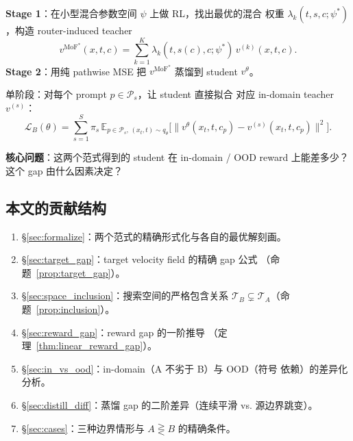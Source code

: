 \documentclass[11pt,a4paper]{article}
\newcommand{\loss}{\mathcal{L}}
\newcommand{\E}{\mathbb{E}}
\newcommand{\MoF}{\mathrm{MoF}}
\theoremstyle{definition}
\begin{document}
\begin{tcolorbox}[colback=blue!5, colframe=blue!50, title=\textbf{Paradigm A: MoF$\to$Distill（本工作）}]
\textbf{Stage 1}：在小型混合参数空间 $\psi$ 上做 RL，找出最优的混合
权重 $\lambda_k(t, s, c; \psi^*)$，构造 router-induced teacher
\begin{equation*}
v^{\MoF^*}(x, t, c) = \sum_{k=1}^K \lambda_k(t, s(c), c; \psi^*)\,v^{(k)}(x, t, c).
\end{equation*}
\textbf{Stage 2}：用纯 pathwise MSE 把 $v^{\MoF^*}$ 蒸馏到 student
$v^\theta$。
\end{tcolorbox}

\begin{tcolorbox}[colback=red!5, colframe=red!50, title=\textbf{Paradigm B: 直接 multi-teacher OPD（route-by-source, OPDTrainer）}]
单阶段：对每个 prompt $p \in \mathcal{P}_s$，让 student 直接拟合
对应 in-domain teacher $v^{(s)}$：
\begin{equation*}
\loss_B(\theta) = \sum_{s=1}^S \pi_s\,\E_{p \in \mathcal{P}_s,\,(x_t, t) \sim q_\theta}\bigl[
\|v^\theta(x_t, t, c_p) - v^{(s)}(x_t, t, c_p)\|^2
\bigr].
\end{equation*}
\end{tcolorbox}

\textbf{核心问题}：这两个范式得到的 student 在 in-domain / OOD reward
上能差多少？这个 gap 由什么因素决定？

\subsection{本文的贡献结构}

\begin{enumerate}[leftmargin=1.5em]
\item \S\ref{sec:formalize}：两个范式的精确形式化与各自的最优解刻画。
\item \S\ref{sec:target_gap}：target velocity field 的精确 gap 公式
（命题~\ref{prop:target_gap}）。
\item \S\ref{sec:space_inclusion}：搜索空间的严格包含关系
$\mathcal{T}_B \subsetneq \mathcal{T}_A$（命题~\ref{prop:inclusion}）。
\item \S\ref{sec:reward_gap}：reward gap 的一阶推导
（定理~\ref{thm:linear_reward_gap}）。
\item \S\ref{sec:in_vs_ood}：in-domain（A 不劣于 B）与 OOD（符号
依赖）的差异化分析。
\item \S\ref{sec:distill_diff}：蒸馏 gap 的二阶差异（连续平滑 vs.\@
源边界跳变）。
\item \S\ref{sec:cases}：三种边界情形与 $A \gtreqless B$ 的精确条件。
\end{enumerate}
\end{document}
